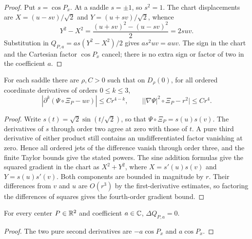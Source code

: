 \begin{proof}
\leanok
Put $s=\cos P_x$. At a saddle $s=\pm1$, so $s^2=1$.
The chart displacements are $X=(u-sv)/\sqrt2$ and
$Y=(u+sv)/\sqrt2$, whence
\[
 Y^2-X^2=\frac{(u+sv)^2-(u-sv)^2}{2}=2suv.
\]
Substitution in $Q_{P,a}=as(Y^2-X^2)/2$ gives $as^2uv=auv$.
The sign in the chart and the Cartesian factor $\cos P_x$ cancel;
there is no extra sign or factor of two in the coefficient $a$.
\end{proof}

\begin{lemma}
\label{lem:saddle-normal-form-derivatives}
\leanok
For each saddle there are $\rho,C>0$ such that on $D_\rho(0)$, for all
ordered coordinate derivatives of orders $0\le k\le3$,
\[
 |\partial^k(\Psi\circ\Xi_P-uv)|\le Cr^{4-k},\qquad
 \bigl||\nabla\Psi|^2\circ\Xi_P-r^2\bigr|\le Cr^4.
\]
\end{lemma}

\begin{proof}
\leanok
Write $s(t)=\sqrt2\sin(t/\sqrt2)$, so that $\Psi\circ\Xi_P=s(u)s(v)$.
The derivatives of $s$ through order two agree at zero with those of $t$.
A pure third derivative of either product still contains an undifferentiated
factor vanishing at zero. Hence all ordered jets of the difference vanish
through order three, and the finite Taylor bounds give the stated powers.
The sine addition formulas give the squared gradient in the chart as
$X^2+Y^2$, where $X=s'(u)s(v)$ and $Y=s(u)s'(v)$.
Both components are bounded in magnitude by $r$. Their differences from
$v$ and $u$ are $O(r^3)$ by the first-derivative estimates, so factoring
the differences of squares gives the fourth-order gradient bound.
\end{proof}

\begin{lemma}
\label{lem:saddle-quadratic-harmonic}
\leanok
For every center $P\in\mathbb{R}^2$ and coefficient $a\in\mathbb{C}$,
$\Delta Q_{P,a}=0$.
\end{lemma}

\begin{proof}
\leanok
The two pure second derivatives are $-a\cos P_x$ and $a\cos P_x$.
\end{proof}

